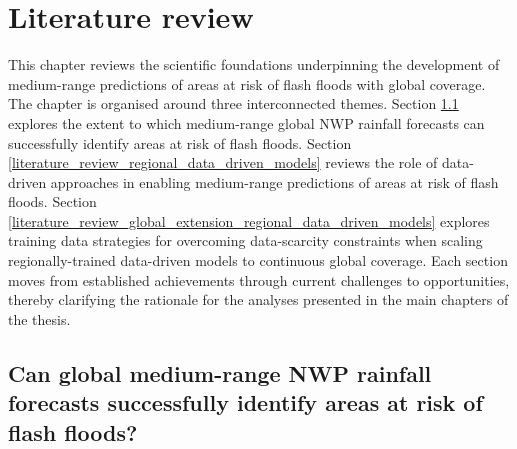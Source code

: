\chapter{Literature review}
\label{literature_review}
\graphicspath{{chapter_02/figures}{chapter_02/tables}}


This chapter reviews the scientific foundations underpinning the development of medium-range predictions of areas at risk of flash floods with global coverage. The chapter is organised around three interconnected themes. Section \ref{literature_review_rainfall_global_nwp} explores the extent to which medium-range global NWP rainfall forecasts can successfully identify areas at risk of flash floods. Section \ref{literature_review_regional_data_driven_models} reviews the role of data-driven approaches in enabling medium-range predictions of areas at risk of flash floods. Section \ref{literature_review_global_extension_regional_data_driven_models} explores training data strategies for overcoming data-scarcity constraints when scaling regionally-trained data-driven models to continuous global coverage. Each section moves from established achievements through current challenges to opportunities, thereby clarifying the rationale for the analyses presented in the main chapters of the thesis.

\section{Can global medium-range NWP rainfall forecasts successfully identify areas at risk of flash floods?}
\label{literature_review_rainfall_global_nwp}

